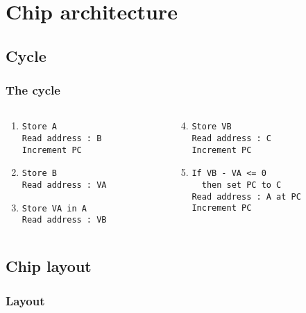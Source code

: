 \documentclass{beamer}
\begin{document}
\section{Chip architecture}
\subsection{Cycle}

\begin{frame}[fragile]
    \frametitle{The cycle}
\begin{columns}[t]
	\begin{column}[T]{4cm}
    \begin{enumerate}
      \setcounter{enumi}{0}
        \item
          \begin{verbatim}
Store A
Read address : B
Increment PC
          \end{verbatim}
        \item
          \begin{verbatim}
Store B
Read address : VA
          \end{verbatim}
        \item
	        \begin{verbatim}
Store VA in A
Read address : VB
          \end{verbatim}
  	\end{enumerate}
	\end{column}
	\begin{column}[T]{6cm}
  	\begin{enumerate}
  	  \setcounter{enumi}{3}
  	    \item
  	      \begin{verbatim}
Store VB
Read address : C
Increment PC
  	      \end{verbatim}
  	    \item 
  	      \begin{verbatim}
If VB - VA <= 0
  then set PC to C
Read address : A at PC
Increment PC
  	      \end{verbatim}
  	\end{enumerate}
	\end{column}
\end{columns}

\end{frame}

\subsection{Chip layout}
\begin{frame}
    \frametitle{Layout}
    \centering
    
\end{frame}
\end{document}
